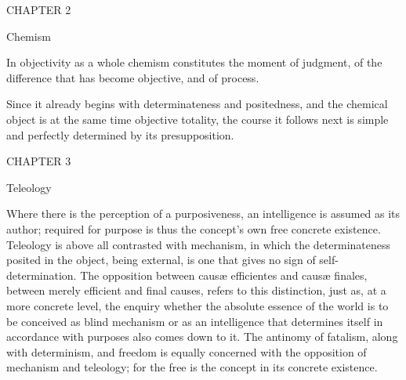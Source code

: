 CHAPTER 2

Chemism

In objectivity as a whole
chemism constitutes the moment of judgment,
of the difference that has become objective,
and of process.

Since it already begins with
determinateness and positedness,
and the chemical object is
at the same time objective totality,
the course it follows next is
simple and perfectly determined
by its presupposition.

CHAPTER 3

Teleology

Where there is the perception of a purposiveness,
an intelligence is assumed as its author;
required for purpose is thus the concept's
own free concrete existence.
Teleology is above all contrasted with mechanism,
in which the determinateness posited in the object,
being external, is one that gives no sign of self-determination.
The opposition between causæ efficientes and causæ finales,
between merely efficient and final causes,
refers to this distinction, just as,
at a more concrete level, the enquiry whether the absolute essence
of the world is to be conceived as blind mechanism
or as an intelligence that determines itself
in accordance with purposes also comes down to it.
The antinomy of fatalism, along with determinism,
and freedom is equally concerned with
the opposition of mechanism and teleology;
for the free is the concept in its concrete existence.

